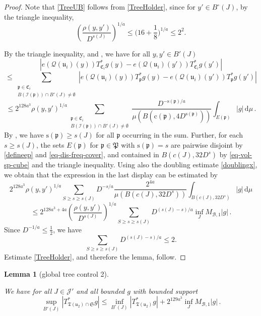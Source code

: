 \documentclass[10pt,a4paper]{article}
\theoremstyle{plain}
\newtheorem{lemma}[theorem]{Lemma}
\theoremstyle{definition}
\numberwithin{equation}{subsection}
\newcommand{\fp}{{\mathfrak p}}
\newcommand{\fP}{{\mathfrak P}}
\newcommand{\fu}{{\mathfrak u}}
\newcommand{\fT}{{\mathfrak T}}
\newcommand{\fC}{{\mathfrak C}}
\newcommand{\pc}{{\mathrm{c}}}
\newcommand{\ps}{{\mathrm{s}}}
\newcommand{\scI}{{\mathcal{I}}} %
\newcommand{\fcc}{{\mathcal{Q}}}
\newcommand{\lean}[1]{}
\newcommand{\uses}[1]{}
\newcommand{\leanok}{}
\begin{document}
    \begin{proof}
        \leanok
        Note that \eqref{TreeUB} follows from \eqref{TreeHolder}, since for $y'\in B^\circ{}(J)$, by the triangle inequality,
        $$\left(\frac{\rho(y,y')}{D^{s(J)}}\right)^{1/a}\le \Big(16 + \frac{1}8\Big)^{1/a}\le 2^2.$$

        By the triangle inequality,  and , we have for all $y, y' \in B'(J)$
        \begin{equation}
            \label{eq-C-Lip}
            |e(\fcc(\fu_i)(y)) T_{\fC_i}^* g(y) - e(\fcc(\fu_i)(y')) T_{\fC_i}^* g(y')|
        \end{equation}
        $$
            \le \sum_{\substack{\fp \in \fC_i\\ B(\scI(\fp)) \cap B'(J) \neq \emptyset}} |e(\fcc(\fu_i)(y)) T_{\fp}^* g(y) - e(\fcc(\fu_i)(y')) T_{\fp}^* g(y')|
        $$
        $$
            \le 2^{128a^3}\rho(y,y')^{1/a} \sum_{\substack{\fp \in \fC_i\\ B(\scI(\fp)) \cap B'(J) \neq \emptyset}} \frac{D^{- \ps(\fp)/a}}{\mu(B(\pc(\fp), 4D^{\ps(\fp)}))} \int_{E(\fp)} |g| \, \mathrm{d}\mu\,.
        $$
        By , we have $\ps(\fp) \ge s(J)$ for all $\fp$ occurring in the sum. Further, for each $s \ge s(J)$, the sets $E(\fp)$ for $\fp \in \fP$ with $\ps(\fp) = s$ are pairwise disjoint by \eqref{defineep} and \eqref{eq-dis-freq-cover}, and contained in $B(c(J), 32D^{s})$ by \eqref{eq-vol-sp-cube} and the triangle inequality. Using also the doubling estimate \eqref{doublingx}, we obtain that the expression in the last display can be estimated by
        $$
            2^{128a^3}\rho(y,y')^{1/a} \sum_{S \ge s \ge s(J)} D^{-s/a} \frac{2^{4a}}{\mu(B(c(J), 32D^{s}))} \int_{B(c(J), 32D^{s})} |g| \, \mathrm{d}\mu
        $$
        $$
            \le 2^{128a^3+4a} \left(\frac{\rho(y,y')}{D^{s(J)}}\right)^{1/a} \sum_{S \ge s \ge s(J)} D^{(s(J) - s)/a} \inf_J M_{\mathcal{B},1} |g|\,.
        $$
        Since $D^{-1/a}\le\frac12$, we have
        $$
            \sum_{S \ge s \ge s(J)} D^{(s(J) - s)/a} \le 2.
        $$
        Estimate \eqref{TreeHolder}, and therefore the lemma, follow.
    \end{proof}

    \begin{lemma}[global tree control 2]
        \label{global-tree-control-2}
        \leanok
        \lean{TileStructure.Forest.global_tree_control2}
        \uses{global-tree-control-1, local-tree-control}
        We have for all $J \in \mathcal{J}'$ and all bounded $g$ with bounded support
        $$
            \sup_{B'(J)} |T^*_{\fT(\fu_2) \cap \mathfrak{S}} g| \le \inf_{B^\circ{}(J)} |T^*_{\fT(\fu_2)} g| + 2^{129a^3} \inf_{J} M_{\mathcal{B},1}|g|\,.
        $$
    \end{lemma}
\end{document}
